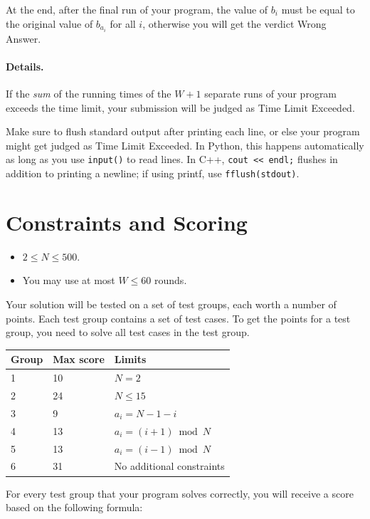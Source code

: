 At the end, after the final run of your program,
the value of $b_i$ must be equal to the original value of $b_{a_{i}}$ for all $i$, otherwise you will get the verdict Wrong Answer.

\paragraph{Details.}
If the \textit{sum} of the running times of the $W+1$ separate runs of your program exceeds the time limit, your submission will be judged as Time Limit Exceeded.

Make sure to flush standard output after printing each line, or else your program might get judged as Time Limit Exceeded.
In Python, this happens automatically as long as you use \texttt{input()} to read lines. In C++, \texttt{cout << endl;} flushes in addition to printing a newline; if using printf, use \texttt{fflush(stdout)}.

\section*{Constraints and Scoring}
\begin{itemize}
\item $2 \le N \le 500$.
\item You may use at most $W \le 60$ rounds.
\end{itemize}

Your solution will be tested on a set of test groups, each worth a number of points.
Each test group contains a set of test cases. To get the points for a test group, you need to
solve all test cases in the test group.



\begin{tabular}{|l|l|l|}
\hline
Group  &  Max score  &  Limits \\
\hline
  1 & 10 & $N = 2$ \\
\hline
  2 & 24 & $N \le 15$  \\
\hline
  3 & 9 & $a_i = N - 1 - i$  \\
\hline
  4 & 13 & $a_i = (i + 1) \bmod N$  \\
\hline
  5 & 13 & $a_i = (i - 1) \bmod N$  \\
\hline
  6 & 31 & No additional constraints  \\
\hline
\end{tabular}

For every test group that your program solves correctly, you will receive a score based on the following formula:


